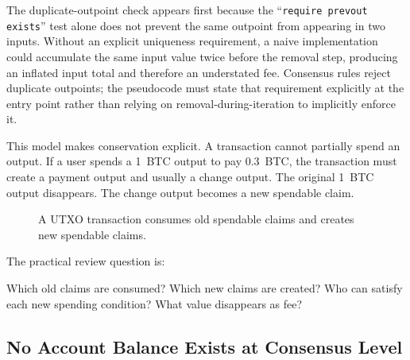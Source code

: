 The duplicate-outpoint check appears first because the ``\texttt{require prevout exists}'' test alone does not prevent the same outpoint from appearing in two inputs. Without an explicit uniqueness requirement, a naive implementation could accumulate the same input value twice before the removal step, producing an inflated input total and therefore an understated fee. Consensus rules reject duplicate outpoints; the pseudocode must state that requirement explicitly at the entry point rather than relying on removal-during-iteration to implicitly enforce it.

This model makes conservation explicit. A transaction cannot partially spend an output. If a user spends a 1~BTC output to pay 0.3~BTC, the transaction must create a payment output and usually a change output. The original 1~BTC output disappears. The change output becomes a new spendable claim.

\begin{figure}[htbp]
\centering
{}
\caption{A UTXO transaction consumes old spendable claims and creates new spendable claims.}
\end{figure}

The practical review question is:

\begin{codeblock}
Which old claims are consumed?
Which new claims are created?
Who can satisfy each new spending condition?
What value disappears as fee?
\end{codeblock}

\subsection{No Account Balance Exists at Consensus Level}

